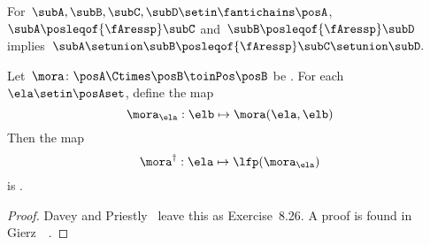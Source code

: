 \begin{lemma}
    \label{lem:antichain_union}
    For~$\subA,\subB,\subC,\subD\setin\fantichains\posA$,~$\subA\posleqof{\fAressp}\subC$
    and~$\subB\posleqof{\fAressp}\subD$ implies~$\subA\setunion \subB\posleqof{\fAressp}\subC\setunion \subD.
    $
\end{lemma}

\begin{lemma}
    \label{lem:dagger}
    Let~$\mora\colon\posA\Ctimes\posB\toinPos\posB$ be .
    For each~$\ela\setin\posAset$, define the map
    \begin{equation}
        \mora_{\ela}:\elb\mapsto \mora(\ela,\elb)
    \end{equation}
    Then the map
    \begin{equation}
        \mora^{\dagger}:\ela\mapsto\lfp(\mora_{\ela})
    \end{equation}
    is .
\end{lemma}
\begin{proof}
    Davey and Priestly~\cite{davey02} leave this as Exercise~8.26.
    A proof is found in Gierz~\etal~\cite[Exercise II-2.29]{gierz03continuous}.
\end{proof}

